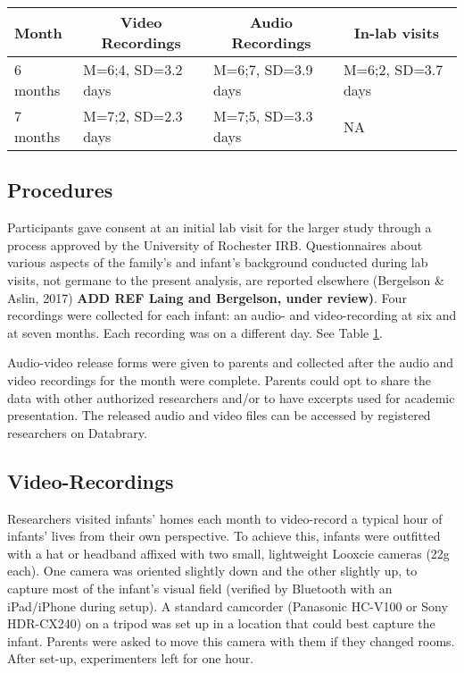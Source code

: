 \documentclass[floatsintext,man]{apa6}
\theoremstyle{definition}
\theoremstyle{definition}
\theoremstyle{definition}
\theoremstyle{remark}
\begin{document}
\begin{table}[tbp]
\begin{center}
\begin{threeparttable}
\caption{\label{tab:recording-ages-table}}
\begin{tabular}{llll}
\toprule
Month & \multicolumn{1}{c}{Video Recordings} & \multicolumn{1}{c}{Audio Recordings} & \multicolumn{1}{c}{In-lab visits}\\
\midrule
6 months & M=6;4, SD=3.2 days & M=6;7, SD=3.9 days & M=6;2, SD=3.7 days\\
7 months & M=7;2, SD=2.3 days & M=7;5, SD=3.3 days & NA\\
\bottomrule
\end{tabular}
\end{threeparttable}
\end{center}
\end{table}

\hypertarget{procedures}{%
\subsection{Procedures}\label{procedures}}

Participants gave consent at an initial lab visit for the larger study
through a process approved by the University of Rochester IRB.
Questionnaires about various aspects of the family's and infant's
background conducted during lab visits, not germane to the present
analysis, are reported elsewhere (Bergelson \& Aslin, 2017) \textbf{ADD
REF Laing and Bergelson, under review)}. Four recordings were collected
for each infant: an audio- and video-recording at six and at seven
months. Each recording was on a different day. See Table
\ref{tab:recording-ages-table}.

Audio-video release forms were given to parents and collected after the
audio and video recordings for the month were complete. Parents could
opt to share the data with other authorized researchers and/or to have
excerpts used for academic presentation. The released audio and video
files can be accessed by registered researchers on Databrary.

\hypertarget{video-recordings}{%
\subsection{Video-Recordings}\label{video-recordings}}

Researchers visited infants' homes each month to video-record a typical
hour of infants' lives from their own perspective. To achieve this,
infants were outfitted with a hat or headband affixed with two small,
lightweight Looxcie cameras (22g each). One camera was oriented slightly
down and the other slightly up, to capture most of the infant's visual
field (verified by Bluetooth with an iPad/iPhone during setup). A
standard camcorder (Panasonic HC-V100 or Sony HDR-CX240) on a tripod was
set up in a location that could best capture the infant. Parents were
asked to move this camera with them if they changed rooms. After set-up,
experimenters left for one hour.
\end{document}

